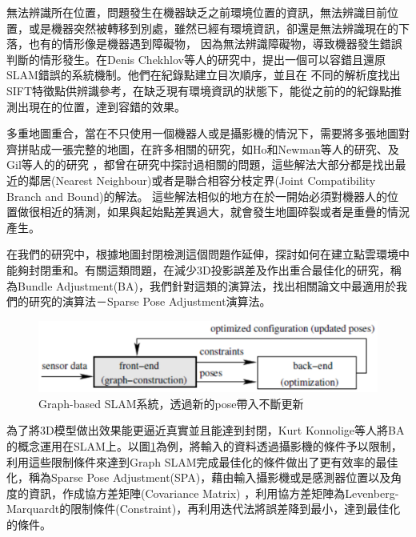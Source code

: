 	無法辨識所在位置，問題發生在機器缺乏之前環境位置的資訊，無法辨識目前位置，或是機器突然被轉移到別處，雖然已經有環境資訊，卻還是無法辨識現在的下落，也有的情形像是機器遇到障礙物，
因為無法辨識障礙物，導致機器發生錯誤判斷的情形發生。在Denis Chekhlov等人的研究中\cite{Chekhlov2008}，提出一個可以容錯且還原SLAM錯誤的系統機制。他們在紀錄點建立目次順序，並且在
不同的解析度找出SIFT特徵點供辨識參考，在缺乏現有環境資訊的狀態下，能從之前的的紀錄點推測出現在的位置，達到容錯的效果。

	多重地圖重合，當在不只使用一個機器人或是攝影機的情況下，需要將多張地圖對齊拼貼成一張完整的地圖，在許多相關的研究，如Ho和Newman等人的研究\cite{Ho2007}、及Gil等人的的研究
\cite{Gil2010}，都曾在研究中探討過相關的問題，這些解法大部分都是找出最近的鄰居(Nearest Neighbour)或者是聯合相容分枝定界(Joint Compatibility Branch and Bound)的解法。
這些解法相似的地方在於一開始必須對機器人的位置做很相近的猜測，如果與起始點差異過大，就會發生地圖碎裂或者是重疊的情況產生。

	在我們的研究中，根據地圖封閉檢測這個問題作延伸，探討如何在建立點雲環境中能夠封閉重和。有關這類問題，在減少3D投影誤差及作出重合最佳化的研究，稱為Bundle 
Adjustment(BA)\cite{Triggs2000}，我們針對這類的演算法，找出相關論文中最適用於我們的研究的演算法－Sparse Pose Adjustment演算法。

\begin{figure}
\begin{center}
  \includegraphics[width=1.0\textwidth]{figures/Graph-based_SLAM.eps}
  \caption{\cite{Konolige2010}Graph-based SLAM系統，透過新的pose帶入不斷更新}
  \label{fig:RGB-D System}
\end{center}

\end{figure}  

	為了將3D模型做出效果能更逼近真實並且能達到封閉，Kurt Konnolige等人將BA的概念運用在SLAM上\cite{Konolige2010}。以圖\ref{fig:RGB-D System}為例，將輸入的資料透過攝影機的條件予以限制，
利用這些限制條件來達到Graph SLAM完成最佳化的條件做出了更有效率的最佳化，稱為Sparse Pose Adjustment(SPA)，藉由輸入攝影機或是感測器位置以及角度的資訊，作成協方差矩陣(Covariance Matrix)
，利用協方差矩陣為Levenberg-Marquardt的限制條件(Constraint)，再利用迭代法將誤差降到最小，達到最佳化的條件。

